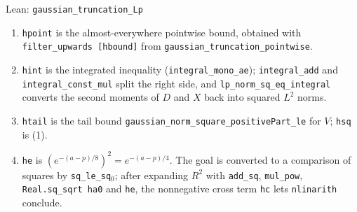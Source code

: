 \documentclass[11pt,a4paper]{article}
\begin{document}
\begin{leanbox}{Lean: \texttt{gaussian\_\allowbreak{}truncation\_\allowbreak{}Lp}}
\begin{enumerate}
\item \texttt{hpoint} is the almost-everywhere pointwise bound, obtained with \texttt{filter\_\allowbreak{}upwards [hbound]} from \texttt{gaussian\_\allowbreak{}truncation\_\allowbreak{}pointwise}.

\item \texttt{hint} is the integrated inequality (\texttt{integral\_\allowbreak{}mono\_\allowbreak{}ae}); \texttt{integral\_\allowbreak{}add} and \texttt{integral\_\allowbreak{}const\_\allowbreak{}mul} split the right side, and \texttt{lp\_\allowbreak{}norm\_\allowbreak{}sq\_\allowbreak{}eq\_\allowbreak{}integral} converts the second moments of \(D\) and \(X\) back into squared \(L^2\) norms.

\item \texttt{htail} is the tail bound \texttt{gaussian\_\allowbreak{}norm\_\allowbreak{}square\_\allowbreak{}positive\allowbreak{}Part\_\allowbreak{}le} for \(V\); \texttt{hsq} is (1).

\item \texttt{he} is \((e^{-(a-p)/8})^2=e^{-(a-p)/4}\). The goal is converted to a comparison of squares by \texttt{sq\_\allowbreak{}le\_\allowbreak{}sq\ensuremath{{}_{0}}}; after expanding \(R^2\) with \texttt{add\_\allowbreak{}sq}, \texttt{mul\_\allowbreak{}pow}, \texttt{Real.\allowbreak{}sq\_\allowbreak{}sqrt ha0} and \texttt{he}, the nonnegative cross term \texttt{hc} lets \texttt{nlinarith} conclude.

\end{enumerate}
\end{leanbox}
\end{document}
